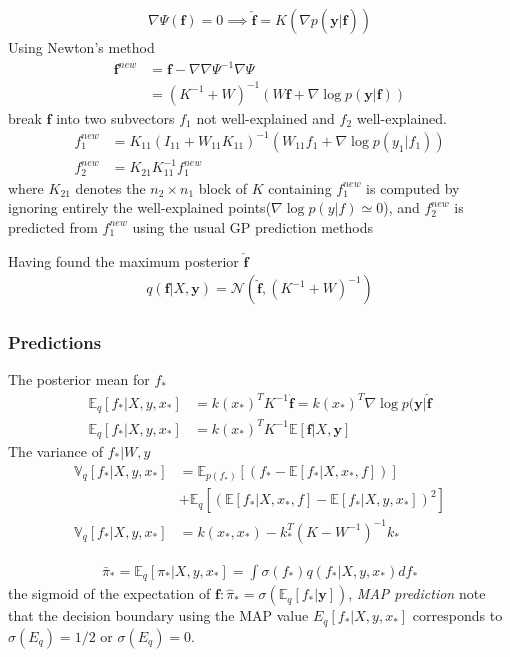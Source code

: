 \documentclass[a4paper]{article}
\begin{document}
\begin{align}
  \nabla \Psi(\mathbf{f}) = 0 \implies \hat{\mathbf{f}} = K(\nabla p(\mathbf{y}|\hat{\mathbf{f}}))
\end{align}
Using Newton's method
\begin{align*}
  \mathbf{f}^{new} &= \mathbf{f} -   \nabla\nabla\Psi^{-1} \nabla\Psi\\
  &= (K^{-1}+W)^{-1} (W \mathbf{f} + \nabla \log p(\mathbf{y}|\mathbf{f}))
\end{align*}
break $\mathbf{f}$ into two subvectors $f_1$ not well-explained and $f_2$ well-explained.
\begin{align*}
  f_1^{new} &= K_{11}(I_{11}+W_{11}K_{11})^{-1} (W_{11}f_1 + \nabla \log p(y_1|f_1))\\
  f_2^{new} &= K_{21}K_{11}^{-1} f_1^{new}
\end{align*}
where $K_{21}$ denotes the $n_2 \times n_1$ block of $K$ containing
$f_1^{new}$ is computed by ignoring entirely the well-explained points($\nabla \log p(y|f) \simeq 0$), and $f_2^{new}$ is predicted from $f_1^{new}$ using the usual GP prediction methods

Having found the maximum posterior $\mathbf{\hat{f}}$
\begin{align*}
  q(\mathbf{f}|X,\mathbf{y}) = \mathcal{N}(\mathbf{\hat{f}}, (K^{-1}+W)^{-1})
\end{align*}

\subsubsection{Predictions}
The posterior mean for $f_*$
\begin{align*}
  \mathbb{E}_q[f_*|X,y,x_*] &= k(x_*)^TK^{-1}\hat{\mathbf{f}} = k(x_*)^T \nabla \log p(\mathbf{y}|\mathbf{\hat{f}}\\
  \mathbb{E}_q[f_*|X,y,x_*] &= k(x_*)^TK^{-1} \mathbb{E}[\mathbf{f}|X,\mathbf{y}]
\end{align*}
The variance of $f_*|W,y$
\begin{align*}
  \mathbb{V}_q[f_*|X,y,x_*] &= \mathbb{E}_{p(f_*)} [(f_* - \mathbb{E}[f_*|X,x_*,f])]\\
  &+ \mathbb{E}_q [(\mathbb{E}[f_*|X,x_*,f]-\mathbb{E}[f_*|X,y,x_*])^2]\\
  \mathbb{V}_q[f_*|X,y,x_*] &= k(x_*,x_*)-k_*^T(K-W^{-1})^{-1}k_*
\end{align*}

\begin{align*}
  \bar{\pi}_* = \mathbb{E}_q[\pi_*|X,y,x_*] = \int \sigma(f_*)q(f_*|X,y,x_*) df_*
\end{align*}
the sigmoid of the expectation of $\mathbf{f}: \hat{\pi}_* = \sigma(\mathbb{E}_q[f_*|\mathbf{y}])$, \textit{MAP prediction}
note that the decision boundary using the MAP value $E_q[f_*|X,y,x_*]$ corresponds to $\sigma(E_q) = 1/2$ or $\sigma(E_q) = 0$.
\end{document}
